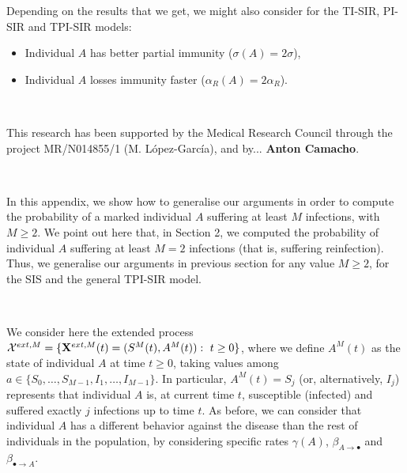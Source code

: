 \documentclass[preprint,12pt]{elsarticle}
\begin{document}
\par Depending on the results that we get, we might also consider for the TI-SIR, PI-SIR and TPI-SIR models:
\begin{itemize}
 \item Individual $A$ has better partial immunity ($\sigma(A)=2\sigma$),
 \item Individual $A$ losses immunity faster ($\alpha_R(A)=2\alpha_R$).
\end{itemize}

\vspace{1cm}

\par{}\\

\par\noindent This research has been supported by the Medical Research Council through the project MR/N014855/1 (M. L\'opez-Garc\'ia), and by... {\bf Anton Camacho}.\\

\vspace{1cm}

\par{}



\vspace{1cm}

\par{}\\

\par In this appendix, we show how to generalise our arguments in order to compute the probability of a marked individual $A$ suffering at least $M$
infections, with $M\geq2$. We point out here that, in Section 2, we computed the probability of individual $A$ suffering at least $M=2$ infections
(that is, suffering reinfection). Thus, we generalise our arguments in previous section for any value $M\geq2$, for the SIS and the general TPI-SIR model.\\

\vspace{0.5cm}

\par{}\\

\par We consider here the extended process ${\cal X}^{ext,M}=\{{\bf X}^{ext,M}(t)=(S^M(t),A^M(t)):\ t\geq0\}$, where we define $A^M(t)$ as the state of
individual $A$ at time $t\geq0$, taking values among $a\in\{S_0,\dots,S_{M-1},I_1,\dots,I_{M-1}\}$. In particular, $A^M(t)=S_j$ (or, alternatively,
$I_j$) represents that individual $A$ is, at current time $t$, susceptible (infected) and suffered exactly $j$ infections up to time $t$. As before, we
can consider that individual $A$ has a different behavior against the disease than the rest of individuals
in the population, by considering specific rates $\gamma(A)$, $\beta_{A\rightarrow\bullet}$ and $\beta_{\bullet\rightarrow A}$.
\end{document}
